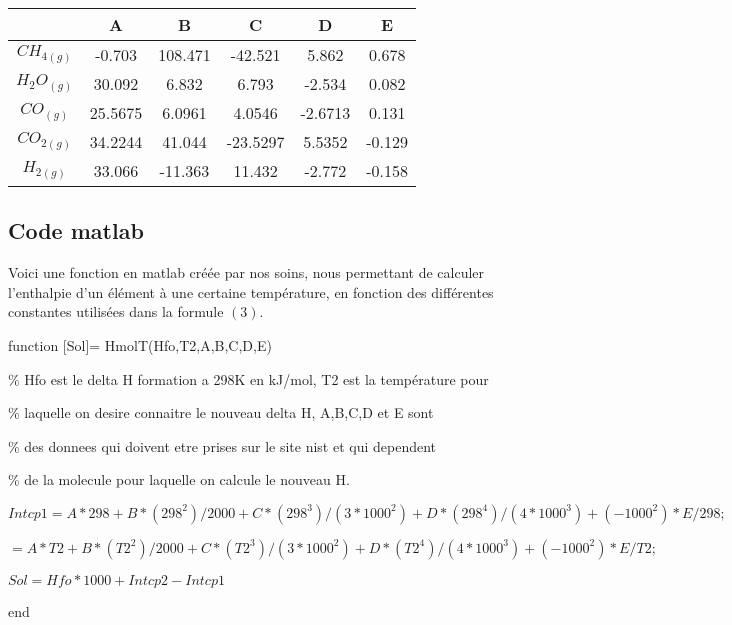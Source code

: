 \documentclass[11pt,a4paper]{report}
\begin{document}
\begin{tabular}{|c|c|c|c|c|c|}
\hline 
\rule[-1ex]{0pt}{2.5ex}  & A & B & C & D & E \\ 
\hline 
\rule[-1ex]{0pt}{2.5ex} $CH_{4(g)}$ & -0.703 & 108.471 & -42.521 & 5.862 & 0.678 \\ 
\hline 
\rule[-1ex]{0pt}{2.5ex} $H_2O_{(g)}$ & 30.092 & 6.832 & 6.793 & -2.534 & 0.082 \\ 
\hline 
\rule[-1ex]{0pt}{2.5ex} $CO_{(g)}$ & 25.5675 & 6.0961 & 4.0546 & -2.6713 & 0.131 \\ 
\hline 
\rule[-1ex]{0pt}{2.5ex} $CO_{2(g)}$ & 34.2244 & 41.044 & -23.5297 & 5.5352 & -0.129 \\ 
\hline 
\rule[-1ex]{0pt}{2.5ex} $H_{2(g)}$ & 33.066 & -11.363 & 11.432 & -2.772 & -0.158 \\ 
\hline 
\end{tabular} 
\subsection*{Code matlab}
Voici une fonction en matlab créée par nos soins, nous permettant de calculer l'enthalpie d'un élément à une certaine
température, en fonction des différentes constantes utilisées dans la formule $(3)$.

function [Sol]= HmolT(Hfo,T2,A,B,C,D,E)

\% Hfo est le delta H formation a 298K en kJ/mol, T2 est la température pour

\% laquelle on desire connaitre le nouveau delta H, A,B,C,D et E sont

\% des donnees qui doivent etre prises sur le site nist et qui dependent

\% de la molecule pour laquelle on calcule le nouveau H.

$Intcp1 = A*298 + B* (298^2)/2000 + C*(298^3)/(3*1000^2) + D*(298^4)/(4*1000^3) + (-1000^2)*E/298;$

$ = A*T2 + B* (T2^2)/2000 + C*(T2^3)/(3*1000^2) + D*(T2^4)/(4*1000^3) + (-1000^2)*E/T2;$

$Sol = Hfo*1000 + Intcp2 - Intcp1$

end
\end{document}
